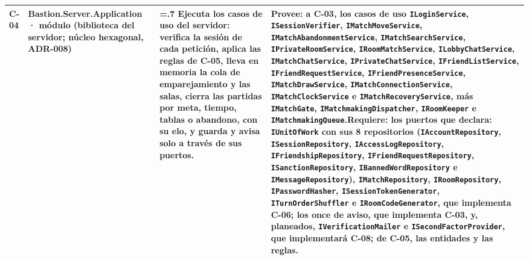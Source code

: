 \documentclass[11pt,letterpaper]{article}
\begin{document}
\begin{xltabular}{\linewidth}{|p{1.4cm}|>{\raggedright\arraybackslash}p{3.6cm}|>{\hsize=.7\hsize}Y|>{\hsize}Y|}
  C-04 & Bastion.Server.\allowbreak Application · módulo (biblioteca del servidor; núcleo hexagonal, ADR-008) & Ejecuta los casos de uso del servidor: verifica la sesión de cada petición, aplica las reglas de C-05, lleva en memoria la cola de emparejamiento y las salas, cierra las partidas por meta, tiempo, tablas o abandono, con su elo, y guarda y avisa solo a través de sus puertos. & \textbf{Provee:} a C-03, los casos de uso \texttt{ILoginService}, \texttt{ISessionVerifier}, \texttt{IMatchMoveService}, \texttt{IMatchAbandonmentService}, \texttt{IMatchSearchService}, \texttt{IPrivateRoomService}, \texttt{IRoomMatchService}, \texttt{ILobbyChatService}, \texttt{IMatchChatService}, \texttt{IPrivateChatService}, \texttt{IFriendListService}, \texttt{IFriendRequestService}, \texttt{IFriendPresenceService}, \texttt{IMatchDrawService}, \texttt{IMatchConnectionService}, \texttt{IMatchClockService} e \texttt{IMatchRecoveryService}, más \texttt{IMatchGate}, \texttt{IMatchmakingDispatcher}, \texttt{IRoomKeeper} e \texttt{IMatchmakingQueue}.\newline\textbf{Requiere:} los puertos que declara: \texttt{IUnitOfWork} con sus 8 repositorios (\texttt{IAccountRepository}, \texttt{ISessionRepository}, \texttt{IAccessLogRepository}, \texttt{IFriendshipRepository}, \texttt{IFriendRequestRepository}, \texttt{ISanctionRepository}, \texttt{IBannedWordRepository} e \texttt{IMessageRepository}), \texttt{IMatchRepository}, \texttt{IRoomRepository}, \texttt{IPasswordHasher}, \texttt{ISessionTokenGenerator}, \texttt{ITurnOrderShuffler} e \texttt{IRoomCodeGenerator}, que implementa C-06; los once de aviso, que implementa C-03, y, planeados, \texttt{IVerificationMailer} e \texttt{ISecondFactorProvider}, que implementará C-08; de C-05, las entidades y las reglas.\\\hline

\end{xltabular}
\end{document}
